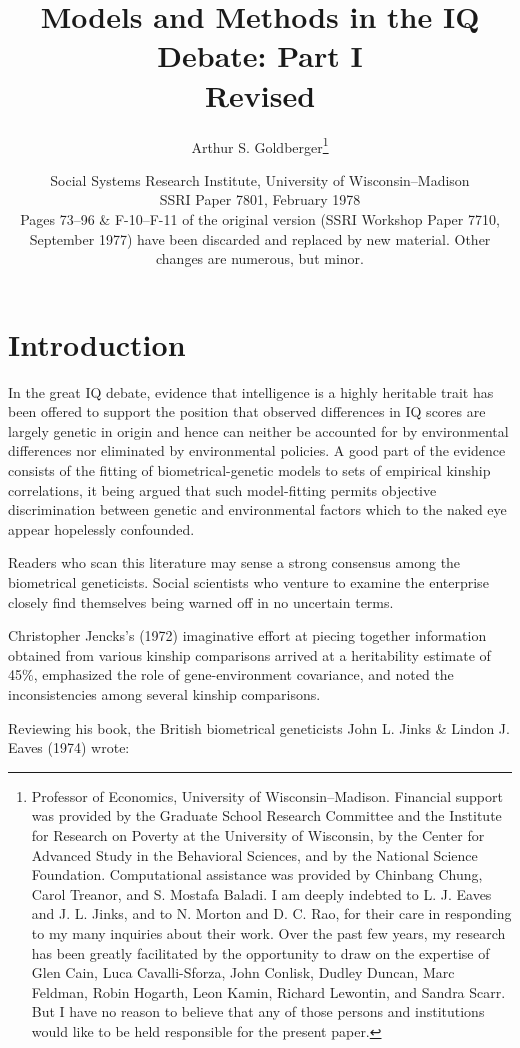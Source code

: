 ﻿\documentclass[12pt]{article}
\title{Models and Methods in the IQ Debate: Part I\\ \large Revised}
\author{Arthur S. Goldberger\thanks{Professor of Economics, University of Wisconsin--Madison. Financial support was provided by the Graduate School Research Committee and the Institute for Research on Poverty at the University of Wisconsin, by the Center for Advanced Study in the Behavioral Sciences, and by the National Science Foundation. Computational assistance was provided by Chinbang Chung, Carol Treanor, and S. Mostafa Baladi. I am deeply indebted to L. J. Eaves and J. L. Jinks, and to N. Morton and D. C. Rao, for their care in responding to my many inquiries about their work. Over the past few years, my research has been greatly facilitated by the opportunity to draw on the expertise of Glen Cain, Luca Cavalli-Sforza, John Conlisk, Dudley Duncan, Marc Feldman, Robin Hogarth, Leon Kamin, Richard Lewontin, and Sandra Scarr. But I have no reason to believe that any of those persons and institutions would like to be held responsible for the present paper.}}
\date{Social Systems Research Institute, University of Wisconsin--Madison\\ SSRI Paper 7801, February 1978\\[4pt] \small Pages 73--96 \& F-10--F-11 of the original version (SSRI Workshop Paper 7710, September 1977) have been discarded and replaced by new material. Other changes are numerous, but minor.}
\begin{document}
\maketitle

\section{Introduction}

In the great IQ debate, evidence that intelligence is a highly heritable trait has been offered to support the position that observed differences in IQ scores are largely genetic in origin and hence can neither be accounted for by environmental differences nor eliminated by environmental policies. A good part of the evidence consists of the fitting of biometrical-genetic models to sets of empirical kinship correlations, it being argued that such model-fitting permits objective discrimination between genetic and environmental factors which to the naked eye appear hopelessly confounded.

Readers who scan this literature may sense a strong consensus among the biometrical geneticists. Social scientists who venture to examine the enterprise closely find themselves being warned off in no uncertain terms.

Christopher Jencks's (1972) imaginative effort at piecing together information obtained from various kinship comparisons arrived at a heritability estimate of 45\%, emphasized the role of gene-environment covariance, and noted the inconsistencies among several kinship comparisons.

Reviewing his book, the British biometrical geneticists John L. Jinks \& Lindon J. Eaves (1974) wrote:
\end{document}
